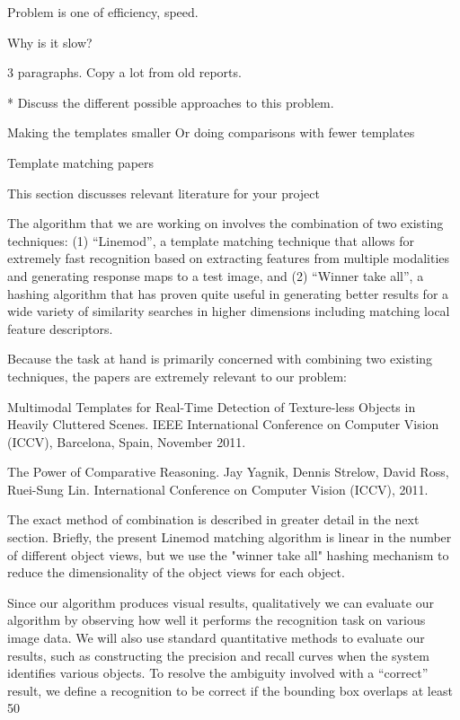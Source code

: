 \documentclass[10pt,twocolumn,letterpaper]{article}
\begin{document}
Problem is one of efficiency, speed. 


Why is it slow?

3 paragraphs. Copy a lot from old reports. 

* Discuss the different possible approaches to this problem.

Making the templates smaller
Or doing comparisons with fewer templates

Template matching papers 

This section discusses relevant literature for your project

The algorithm that we are working on involves the combination of two existing techniques: (1) “Linemod”, a template matching technique that allows for extremely fast recognition based on extracting features from multiple modalities and generating response maps to a test image, and (2) “Winner take all”, a hashing algorithm that has proven quite useful in generating better results for a wide variety of similarity searches in higher dimensions including matching local feature descriptors.

Because the task at hand is primarily concerned with combining two existing techniques, the papers are extremely relevant to our problem:

Multimodal Templates for Real-Time Detection of Texture-less Objects in Heavily Cluttered Scenes. IEEE International Conference on Computer Vision (ICCV), Barcelona, Spain, November 2011.

The Power of Comparative Reasoning. Jay Yagnik, Dennis Strelow, David Ross, Ruei-Sung Lin. International Conference on Computer Vision (ICCV), 2011.

The exact method of combination is described in greater detail in the next section. Briefly, the present Linemod matching algorithm is linear in the number of different object views, but we use the "winner take all" hashing mechanism to reduce the dimensionality of the object views for each object.

Since our algorithm produces visual results, qualitatively we can evaluate our algorithm by observing how well it performs the recognition task on various image data. We will also use standard quantitative methods to evaluate our results, such as constructing the precision and recall curves when the system identifies various objects. To resolve the ambiguity involved with a “correct” result, we deﬁne a recognition to be correct if the bounding box overlaps at least 50%
\end{document}
